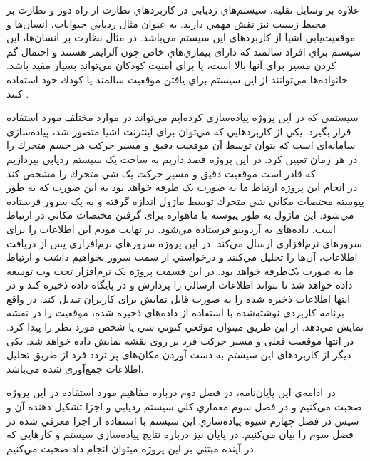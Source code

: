علاوه بر وسايل نقليه، سيستم‌هاي رديابي در كاربردهاي نظارت از راه دور و نظارت بر محیط زیست نيز نقش مهمي دارند. به عنوان مثال رديابي حيوانات، انسان‌ها و موقعيت‌يابي اشيا از كاربردهاي اين سيستم می‌باشد. در مثال نظارت بر انسان‌ها، اين سيستم براي افراد سالمند كه دارای بيماري‌هاي خاص چون آلزايمر هستند و احتمال گم كردن مسير براي آنها بالا است، يا براي امنيت كودكان مي‌تواند بسيار مفيد باشد. خانواده‌ها مي‌توانند از اين سيستم براي يافتن موقعيت سالمند يا كودك خود استفاده كنند \cite{Saranya2013}. 


سيستمي كه در اين پروژه پياده‌سازي كرده‌ايم مي‌تواند در موارد مختلف مورد استفاده قرار بگيرد.
يکي از كاربردهايي كه مي‌توان برای اينترنت اشيا متصور شد، پياده‌سازی سامانه‌ای است كه بتوان توسط آن موقعيت دقيق و مسير حركت هر جسم متحرك را در هر زمان تعيين كرد. در اين پروژه قصد داريم به ساخت يک سيستم رديابي بپردازيم كه قادر است موقعيت دقيق و مسير حركت يک شي متحرك را مشخص كند. \\در انجام اين پروژه ارتباط ما به صورت يک طرفه خواهد بود به اين صورت كه به طور پيوسته مختصات مکاني شي متحرك توسط ماژول  اندازه گرفته و به يک سرور فرستاده مي‌شود. اين ماژول به طور پيوسته با ماهواره برای گرفتن مختصات مکاني در ارتباط است. داده‌های  به آردوينو فرستاده مي‌شود. در نهايت مودم  اين اطلاعات را برای سرورهای نرم‌افزاری ارسال مي‌كند. در اين پروژه سرورهای نرم‌افزاری پس از دريافت اطلاعات، آن‌ها را تحليل مي‌كنند و درخواستي از سمت سرور نخواهيم داشت و ارتباط ما به صورت يک‌طرفه خواهد بود. در اين قسمت پروژه يک نرم‌افزار تحت وب توسعه داده خواهد شد تا بتواند اطلاعات ارسالي را پردازش و در پایگاه داده ذخيره كند و در انتها اطلاعات ذخيره شده را به صورت قابل نمايش برای كاربران تبديل كند. در واقع برنامه كاربردي نوشته‌شده با استفاده از داده‌هاي ذخیره شده، موقعيت را در نقشه نمايش مي‌دهد. از اين طريق ميتوان موقعي كنوني شي يا شخص مورد نظر را پيدا كرد. در انتها موقعیت فعلی و مسیر حرکت فرد بر روی نقشه نمایش داده خواهد شد. یکی دیگر از کاربردهای این سیستم به دست آوردن مکان‌های پر تردد فرد از طریق تحلیل اطلاعات جمع‌آوری شده می‌باشد.


در ادامه‌ي اين پايان‌نامه، در فصل دوم درباره مفاهیم مورد استفاده در این پروژه صحبت می‌کنیم و در فصل سوم معماري كلي سيستم رديابي و اجزا تشكيل دهنده آن و سپس در فصل چهارم شيوه پياده‌سازي اين سيستم با استفاده از اجزا معرفي شده در فصل سوم را بيان مي‌كنيم. در پايان نيز درباره نتايج پياده‌سازي سيستم و كارهايي كه در آينده مبتني بر اين پروژه ميتوان انجام داد صحبت مي‌كنيم.


   